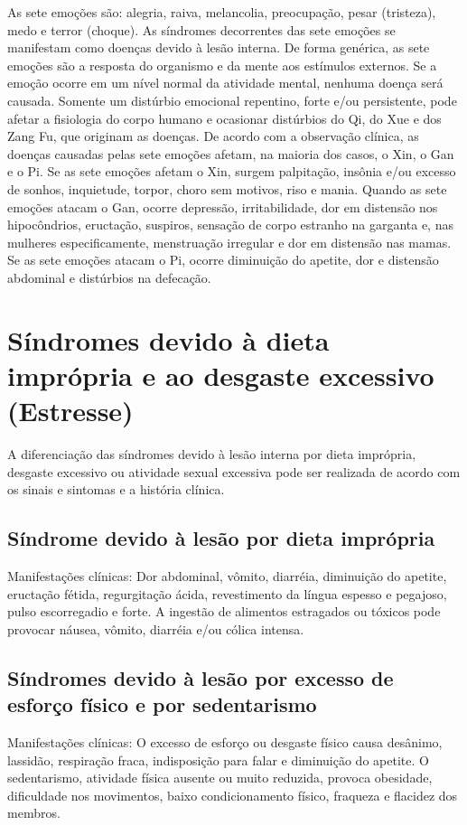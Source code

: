 \documentclass[12pt,oneside,a4paper]{book} %
\begin{document}
As sete emoções são: alegria, raiva, melancolia, preocupação, pesar (tristeza), medo e terror (choque). As síndromes decorrentes das sete emoções se manifestam como doenças devido à lesão interna. De forma genérica, as sete emoções são a resposta do organismo e da mente aos estímulos externos. Se a emoção ocorre em um nível normal da atividade mental, nenhuma doença será causada. Somente um distúrbio emocional repentino, forte e/ou persistente, pode afetar a fisiologia do corpo humano e ocasionar distúrbios do Qi, do Xue e dos Zang Fu, que originam as doenças.
De acordo com a observação clínica, as doenças causadas pelas sete emoções afetam, na maioria dos casos, o Xin, o Gan e o Pi. Se as sete emoções afetam o Xin, surgem palpitação, insônia e/ou excesso de sonhos, inquietude, torpor, choro sem motivos, riso e mania.
Quando as sete emoções atacam o Gan, ocorre depressão, irritabilidade, dor em distensão nos hipocôndrios, eructação, suspiros, sensação de corpo estranho na garganta e, nas mulheres especificamente, menstruação irregular e dor em distensão nas mamas.
Se as sete emoções atacam o Pi, ocorre diminuição do apetite, dor e distensão abdominal e distúrbios na defecação.

\chapter{Síndromes devido à dieta imprópria e ao desgaste excessivo (Estresse)}

A diferenciação das síndromes devido à lesão interna por dieta imprópria, desgaste excessivo ou atividade sexual excessiva pode ser realizada de acordo com os sinais e sintomas e a história clínica.

\section{Síndrome devido à lesão por dieta imprópria}
Manifestações clínicas: Dor abdominal, vômito, diarréia, diminuição do apetite, eructação fétida, regurgitação ácida, revestimento da língua espesso e pegajoso, pulso escorregadio e forte. A ingestão de alimentos estragados ou tóxicos pode provocar náusea, vômito, diarréia e/ou cólica intensa.

\section{Síndromes devido à lesão por excesso de esforço físico e por sedentarismo}
Manifestações clínicas: O excesso de esforço ou desgaste físico causa desânimo, lassidão, respiração fraca, indisposição para falar e diminuição do apetite. O sedentarismo, atividade física ausente ou muito reduzida, provoca obesidade, dificuldade nos movimentos, baixo condicionamento físico, fraqueza e flacidez dos membros.
\end{document}

